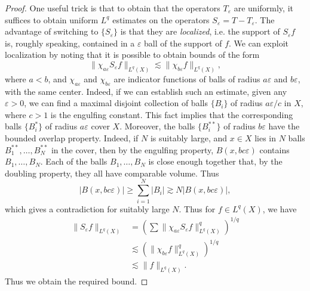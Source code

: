 \begin{proof}
    One useful trick is that to obtain that the operators $T_\varepsilon$ are uniformly, it suffices to obtain uniform $L^q$ estimates on the operators $S_\varepsilon = T - T_\varepsilon$. The advantage of switching to $\{ S_\varepsilon \}$ is that they are \emph{localized}, i.e. the support of $S_\varepsilon f$ is, roughly speaking, contained in a $\varepsilon$ ball of the support of $f$. We can exploit localization by noting that it is possible to obtain bounds of the form
    \[ \| \chi_{a \varepsilon} S_\varepsilon f \|_{L^q(X)} \lesssim \| \chi_{b \varepsilon} f \|_{L^q(X)}, \]
    where $a < b$, and $\chi_{a \varepsilon}$ and $\chi_{b \varepsilon}$ are indicator functions of balls of radius $a \varepsilon$ and $b \varepsilon$, with the same center. Indeed, if we can establish such an estimate, given any $\varepsilon > 0$, we can find a maximal disjoint collection of balls $\{ B_i \}$ of radius $a \varepsilon / c$ in $X$, where $c > 1$ is the engulfing constant. This fact implies that the corresponding balls $\{ B_i^* \}$ of radius $a \varepsilon$ cover $X$. Moreover, the balls $\{ B_i^{**} \}$ of radius $b \varepsilon$ have the bounded overlap property. Indeed, if $N$ is suitably large, and $x \in X$ lies in $N$ balls $B_1^{**}, \dots, B_N^{**}$ in the cover, then by the engulfing property, $B(x, bc \varepsilon)$ contains $B_1, \dots, B_N$. Each of the balls $B_1, \dots, B_N$ is close enough together that, by the doubling property, they all have comparable volume. Thus
    \[ |B(x, bc \varepsilon)| \geq \sum_{i = 1}^N |B_i| \gtrsim N |B(x, b c \varepsilon)|, \]
    which gives a contradiction for suitably large $N$. Thus for $f \in L^q(X)$, we have
    \begin{align*}
        \| S_\varepsilon f \|_{L^q(X)} &= \left( \sum \| \chi_{a \varepsilon} S_\varepsilon f \|_{L^q(X)}^q \right)^{1/q}\\
        &\lesssim \left( \| \chi_{b \varepsilon} f \|_{L^q(X)}^q \right)^{1/q}\\
        &\lesssim \| f \|_{L^q(X)}.
    \end{align*}
    Thus we obtain the required bound.


\end{proof}
